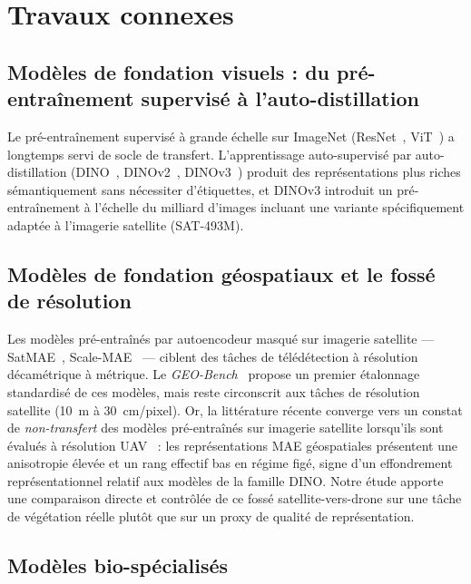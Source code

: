 \documentclass[11pt,a4paper]{article}
\begin{document}
\section{Travaux connexes}
\label{sec:related}

\subsection{Modèles de fondation visuels : du pré-entraînement supervisé à l'auto-distillation}

Le pré-entraînement supervisé à grande échelle sur ImageNet (ResNet~\autocite{he2016resnet}, ViT~\autocite{dosovitskiy2021vit}) a longtemps servi de socle de transfert. L'apprentissage auto-supervisé par auto-distillation (DINO~\autocite{caron2021dino}, DINOv2~\autocite{oquab2023dinov2}, DINOv3~\autocite{darcet2024dinov3}) produit des représentations plus riches sémantiquement sans nécessiter d'étiquettes, et DINOv3 introduit un pré-entraînement à l'échelle du milliard d'images incluant une variante spécifiquement adaptée à l'imagerie satellite (SAT-493M).

\subsection{Modèles de fondation géospatiaux et le fossé de résolution}

Les modèles pré-entraînés par autoencodeur masqué sur imagerie satellite — SatMAE~\autocite{cong2022satmae}, Scale-MAE~\autocite{reed2023scalemae} — ciblent des tâches de télédétection à résolution décamétrique à métrique. Le \emph{GEO-Bench}~\autocite{lacoste2024geobench} propose un premier étalonnage standardisé de ces modèles, mais reste circonscrit aux tâches de résolution satellite (10~m à 30~cm/pixel). Or, la littérature récente converge vers un constat de \emph{non-transfert} des modèles pré-entraînés sur imagerie satellite lorsqu'ils sont évalués à résolution UAV~\autocite{sosa2024effective} : les représentations MAE géospatiales présentent une anisotropie élevée et un rang effectif bas en régime figé, signe d'un effondrement représentationnel relatif aux modèles de la famille DINO. Notre étude apporte une comparaison directe et contrôlée de ce fossé satellite-vers-drone sur une tâche de végétation réelle plutôt que sur un proxy de qualité de représentation.

\subsection{Modèles bio-spécialisés}
\end{document}
